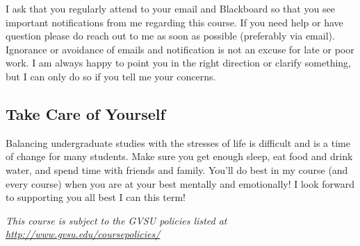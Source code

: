 \documentclass[
  12pt,
  letterpaper,
]{scrartcl}
\begin{document}
I ask that you regularly attend to your email and Blackboard so that you
see important notifications from me regarding this course. If you need
help or have question please do reach out to me as soon as possible
(preferably via email). Ignorance or avoidance of emails and
notification is not an excuse for late or poor work. I am always happy
to point you in the right direction or clarify something, but I can only
do so if you tell me your concerns.

\subsection{Take Care of Yourself}\label{take-care-of-yourself}

Balancing undergraduate studies with the stresses of life is difficult
and is a time of change for many students. Make sure you get enough
sleep, eat food and drink water, and spend time with friends and family.
You'll do best in my course (and every course) when you are at your best
mentally and emotionally! I look forward to supporting you all best I
can this term!

\emph{This course is subject to the GVSU policies listed at
\url{http://www.gvsu.edu/coursepolicies/}}
\end{document}
